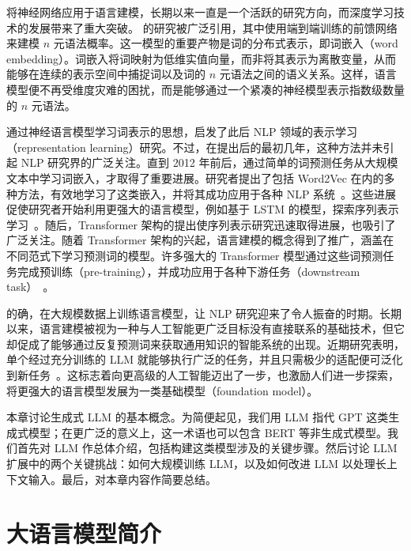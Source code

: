 将神经网络应用于语言建模，长期以来一直是一个活跃的研究方向，而深度学习技术的发展带来了重大突破。\citet{Bengio-et-al:2003} 的研究被广泛引用，其中使用端到端训练的前馈网络来建模 $n$ 元语法概率。这一模型的重要产物是词的分布式表示，即词嵌入（word embedding）。词嵌入将词映射为低维实值向量，而非将其表示为离散变量，从而能够在连续的表示空间中捕捉词以及词的 $n$ 元语法之间的语义关系。这样，语言模型便不再受维度灾难的困扰，而是能够通过一个紧凑的神经模型表示指数级数量的 $n$ 元语法。

通过神经语言模型学习词表示的思想，启发了此后 NLP 领域的表示学习（representation learning）研究。不过，在提出后的最初几年，这种方法并未引起 NLP 研究界的广泛关注。直到 2012 年前后，通过简单的词预测任务从大规模文本中学习词嵌入，才取得了重要进展。研究者提出了包括 Word2Vec 在内的多种方法，有效地学习了这类嵌入，并将其成功应用于各种 NLP 系统~\cite{mikolov:2013efficient,Mikolov-et-al:2013distributed}。这些进展促使研究者开始利用更强大的语言模型，例如基于 LSTM 的模型，探索序列表示学习~\cite{sutskever-etal:2014sequence,peters-etal:2018deep}。随后，Transformer 架构的提出使序列表示研究迅速取得进展，也吸引了广泛关注。随着 Transformer 架构的兴起，语言建模的概念得到了推广，涵盖在不同范式下学习预测词的模型。许多强大的 Transformer 模型通过这些词预测任务完成预训练（pre-training），并成功应用于各种下游任务（downstream task）~\cite{devlin-etal:2019bert}。

的确，在大规模数据上训练语言模型，让 NLP 研究迎来了令人振奋的时期。长期以来，语言建模被视为一种与人工智能更广泛目标没有直接联系的基础技术，但它却促成了能够通过反复预测词来获取通用知识的智能系统的出现。近期研究表明，单个经过充分训练的 LLM 就能够执行广泛的任务，并且只需极少的适配便可泛化到新任务~\cite{bubeck-etal:2023sparks}。这标志着向更高级的人工智能迈出了一步，也激励人们进一步探索，将更强大的语言模型发展为一类基础模型（foundation model）。

本章讨论生成式 LLM 的基本概念。为简便起见，我们用 LLM 指代 GPT 这类生成式模型；在更广泛的意义上，这一术语也可以包含 BERT 等非生成式模型。我们首先对 LLM 作总体介绍，包括构建这类模型涉及的关键步骤。然后讨论 LLM 扩展中的两个关键挑战：如何大规模训练 LLM，以及如何改进 LLM 以处理长上下文输入。最后，对本章内容作简要总结。


\section{大语言模型简介}


